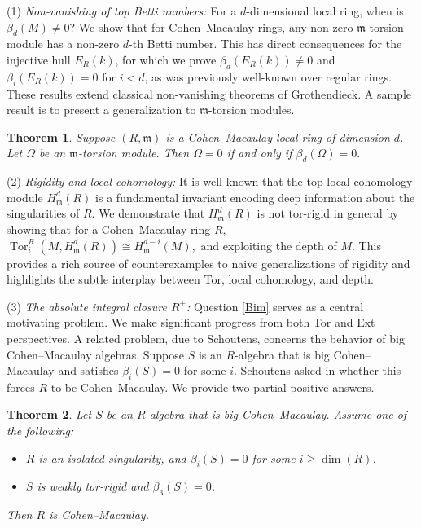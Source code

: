 \documentclass[11pt,a4paper]{amsart}
\numberwithin{equation}{section}
\newtheorem{theorem}{Theorem}[section]
\theoremstyle{definition}
\theoremstyle{remark}
\begin{document}
(1) \textit{Non-vanishing of top Betti numbers:} For a \(d\)-dimensional local ring, when is \(\beta_d(M) \neq 0\)? We show that for Cohen--Macaulay rings, any non-zero \(\mathfrak{m}\)-torsion module has a non-zero \(d\)-th Betti number. This has direct consequences for the injective hull \(E_R(k)\), for which we prove \(\beta_d(E_R(k)) \neq 0\) and \(\beta_i(E_R(k))=0\) for \(i<d\), as was previously well-known over regular rings. These results extend classical non-vanishing theorems of Grothendieck. A sample result is to present a generalization to \(\mathfrak{m}\)-torsion modules.
		\begin{theorem}\label{13}
			Suppose \((R,\mathfrak{m})\) is a Cohen--Macaulay local ring of dimension \(d\). Let \(\Omega\) be an \(\mathfrak{m}\)-torsion module. Then $\Omega=0$  if and only if $\beta_d(\Omega)=0.$
		\end{theorem}
		
(2) \textit{Rigidity and local cohomology:} It is well known that the top local cohomology module \(H^d_{\mathfrak{m}}(R)\) is a fundamental invariant encoding deep information about the singularities of \(R\). We demonstrate that \(H^d_{\mathfrak{m}}(R)\) is  {not} tor-rigid in general by showing that for a Cohen--Macaulay ring \(R\),
		\(
		\operatorname{Tor}_i^R(M, H^d_{\mathfrak{m}}(R)) \cong H^{d-i}_{\mathfrak{m}}(M),
		\)
		and exploiting the depth of \(M\). This provides a rich source of counterexamples to naive generalizations of rigidity and highlights the subtle interplay between Tor, local cohomology, and depth.
		
(3) \textit{The absolute integral closure \(R^+\):} {Question} \ref{Bim} serves as a central motivating problem. We make significant progress from both Tor and Ext perspectives. 
A related problem, due to Schoutens, concerns the behavior of big Cohen--Macaulay algebras. Suppose \(S\) is an \(R\)-algebra that is big Cohen--Macaulay and satisfies \(\beta_i(S)=0\) for some  \(i\). Schoutens asked in \cite{sc1} whether this forces \(R\) to be Cohen--Macaulay. We provide two partial positive answers.
	
	\begin{theorem}\label{14}
		Let \(S\) be an \(R\)-algebra that is big Cohen--Macaulay.  Assume one of the following:
		\begin{itemize}
			\item[(i)] \(R\) is an isolated singularity, and \(\beta_i(S)=0\) for some \(i \geq \dim(R)\).
			\item[(ii)] \(S\) is weakly tor-rigid and \(\beta_3(S)=0\).
		\end{itemize}
		Then \(R\) is Cohen--Macaulay.
	\end{theorem}
	
\end{document}
